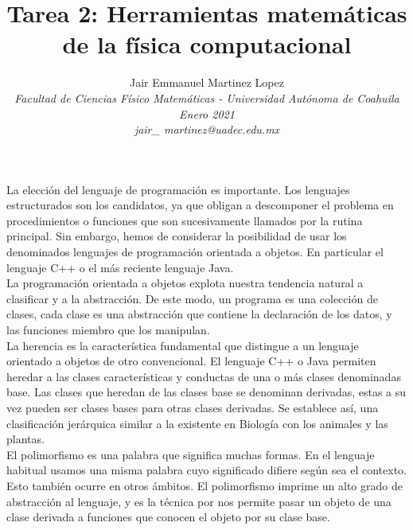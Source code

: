 \documentclass[12pt,a4paper]{article}
\title{\vspace{-10mm}\fontsize{14pt}{10pt}\textbf{Tarea 2: Herramientas matemáticas de la física computacional}} %
\author{
\normalsize Jair Emmanuel Martinez Lopez\\ %
\textit{\normalsize Facultad de Ciencias Físico Matemáticas - Universidad Autónoma de Coahuila}\\ %
\textit{\normalsize Enero 2021}\\
\textit{\normalsize jair\_ martinez@uadec.edu.mx} %
\vspace{-5mm}
}
\date{}
\begin{document}
\maketitle
\thispagestyle{fancy}


La elección del lenguaje de programación es importante. Los lenguajes estructurados son los candidatos, ya que obligan a descomponer el problema en procedimientos o funciones que son sucesivamente llamados por la rutina principal. Sin embargo, hemos de considerar la posibilidad de usar los denominados lenguajes de programación orientada a objetos. En particular el lenguaje C++ o el más reciente lenguaje Java.\\

La programación orientada a objetos explota nuestra tendencia natural a clasificar y a la abstracción. De este modo, un programa es una colección de clases, cada clase es una abstracción que contiene la declaración de los datos, y las funciones miembro que los manipulan.\\

La herencia es la característica fundamental que distingue a un lenguaje orientado a objetos de otro convencional. El lenguaje C++ o Java permiten heredar a las clases características y conductas de una o más clases denominadas base. Las clases que heredan de las clases base se denominan derivadas, estas a su vez pueden ser clases bases para otras clases derivadas. Se establece así, una clasificación jerárquica similar a la existente en Biología con los animales y las plantas.\\

El polimorfismo es una palabra que significa muchas formas. En el lenguaje habitual usamos una misma palabra cuyo significado difiere según sea el contexto. Esto también ocurre en otros ámbitos. El polimorfismo imprime un alto grado de abstracción al lenguaje, y es la técnica por nos permite pasar un objeto de una clase derivada a funciones que conocen el objeto por su clase base.
\end{document}
